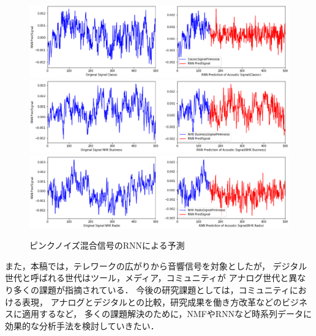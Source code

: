 \documentclass{deimj}
\begin{document}
%
\begin{figure}
\vspace{-6pt}
\includegraphics[width=0.85\columnwidth]{./eps/RNN_Pinknoise/RNN_Pinknoise_Classic.eps}\\
\label{fig:Noise}
\includegraphics[width=0.85\columnwidth]{./eps/RNN_Pinknoise/RNN_Pinknoise_NHKBusiness.eps}\\
\label{fig:Noise}
\includegraphics[width=0.85\columnwidth]{./eps/RNN_Pinknoise/RNN_Pinknoise_NHKRadio.eps}
\vspace{-3pt}
\caption{ピンクノイズ混合信号のRNNによる予測}
\vspace{-10pt}
\label{fig:PinknoiseNoise}
\vspace{-10pt}
\end{figure}

また，本稿では，テレワークの広がりから音響信号を対象としたが，
デジタル世代と呼ばれる世代はツール，メディア，コミュニティが
アナログ世代と異なり多くの課題が指摘されている\cite{book_dentsu}．
今後の研究課題としては，コミュニティにおける表現，
アナログとデジタルとの比較，研究成果を働き方改革などのビジネスに適用するなど，
多くの課題解決のために，NMFやRNNなど時系列データに効果的な分析手法を検討していきたい．

\vspace{-8pt}
\end{document}
